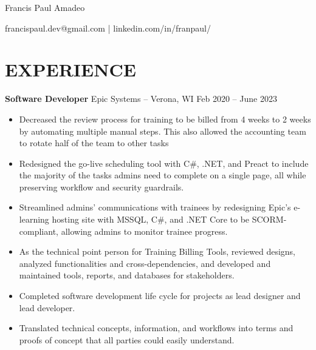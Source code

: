\documentclass[11pt,letterpaper]{article}
\newcommand{\subheading}[3]{
    \textbf{#1}{ #2 }{\hfill #3 \vspace{-2pt}}
}
\begin{document}
\centerline{\Huge Francis Paul Amadeo}
\centerline{francispaul.dev@gmail.com | linkedin.com/in/franpaul/}


\section*{EXPERIENCE}
\subheading{Software Developer}{ Epic Systems -- Verona, WI}{Feb 2020 -- June 2023 \\}
\vspace{-5pt}
\begin{itemize}
  \item Decreased the review process for training to be billed from 4 weeks to 2 weeks by automating multiple manual steps. This also allowed the accounting team to rotate half of the team to other tasks
  \item Redesigned the go-live scheduling tool with C\#, .NET, and Preact to include the majority of the tasks admins need to complete on a single page, all while preserving workflow and security guardrails.
  \item Streamlined admins' communications with trainees by redesigning Epic's e-learning hosting site with MSSQL, C\#, and .NET Core to be SCORM-compliant, allowing admins to monitor trainee progress.
  \item As the technical point person for Training Billing Tools, reviewed designs, analyzed functionalities and cross-dependencies, and developed and maintained tools, reports, and databases for stakeholders.
  \item Completed software development life cycle for projects as lead designer and lead developer.
  \item Translated technical concepts, information, and workflows into terms and proofs of concept that all parties could easily understand.

\end{itemize}
\end{document}
